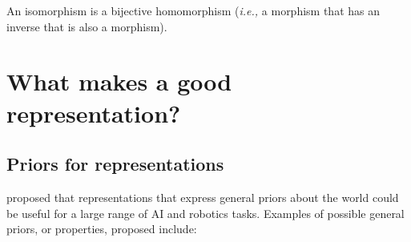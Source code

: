 An isomorphism is a bijective homomorphism (\textit{i.e.,} a morphism that has an inverse that is also a morphism).


\section{What makes a good representation?}\label{sec:What makes a good representation?}

\subsection{Priors for representations}

\autocite{Bengio2013} proposed that representations that express general priors about the world could be useful for a large range of AI and robotics tasks.
Examples of possible general priors, or properties, proposed include:
